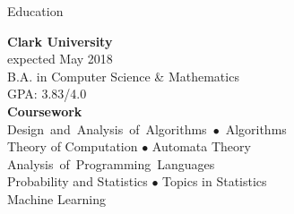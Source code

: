 \documentclass{resume} %
\newcommand{\mybullet}[0]{\textcolor{mygray}{$\bullet$} }
\begin{document}

\begin{rSection}{Education}

\color{jobcolor}
\begin{vwcol}[widths={0.45, 0.55}, indent=0pt, rule=0pt]
\textcolor{jobcolor}{\textbf{Clark University}}\\
\textcolor{mygray}{expected May 2018} \\
B.A. in Computer Science \& Mathematics \\
GPA: 3.83/4.0
\vspace{5 mm}
\\


\textcolor{jobcolor}{\textbf{Coursework}} \\ \mbox{Design and Analysis of Algorithms \mybullet Algorithms}\\
Theory of Computation \mybullet Automata Theory \\
\mbox{Analysis of Programming Languages}\\ Probability and Statistics \mybullet Topics in Statistics\\
Machine Learning

\end{vwcol}

\end{rSection}

\end{document}
